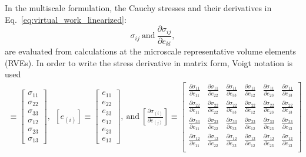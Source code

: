 In the multiscale formulation, the Cauchy stresses and their derivatives in Eq.\ \eqref{eq:virtual_work_linearized}:
%
\begin{equation}
\sigma_{ij} \ \text{and} \ \frac{\partial \sigma_{ij}}{\partial e_{kl}},
\label{eq:sigma_terms}
\end{equation}
%
are evaluated from calculations at the microscale representative volume elements (RVEs). In order to write the stress derivative in matrix form, Voigt notation is used 
%
\begin{eqnarray}
[\sigma_{(i)}] \equiv 
\begin{bmatrix}
\sigma_{11} \\ \sigma_{22} \\ \sigma_{33} \\ \sigma_{12} \\ \sigma_{23} \\ \sigma_{13}
\end{bmatrix} , \ \
%
[e_{(i)}] \equiv
\begin{bmatrix}
e_{11} \\ e_{22} \\ e_{33} \\ e_{12} \\ e_{23} \\ e_{13} 
\end{bmatrix}, \ \text{and} \
%
\left[ \frac{\partial \sigma_{(i)}}{\partial e_{(j)}} \right] \equiv 
\begin{bmatrix}
\frac{\partial \sigma_{11}}{\partial e_{11}} & \frac{\partial \sigma_{11}}{\partial e_{22}} & \frac{\partial \sigma_{11}}{\partial e_{33}} & \frac{\partial \sigma_{11}}{\partial e_{12}} & \frac{\partial \sigma_{11}}{\partial e_{23}} & \frac{\partial \sigma_{11}}{\partial e_{13}} \\
%
\frac{\partial \sigma_{22}}{\partial e_{11}} & \frac{\partial \sigma_{22}}{\partial e_{22}} & \frac{\partial \sigma_{22}}{\partial e_{33}} & \frac{\partial \sigma_{22}}{\partial e_{12}} & \frac{\partial \sigma_{22}}{\partial e_{23}} & \frac{\partial \sigma_{22}}{\partial e_{13}} \\
%
\frac{\partial \sigma_{33}}{\partial e_{11}} & \frac{\partial \sigma_{33}}{\partial e_{22}} & \frac{\partial \sigma_{33}}{\partial e_{33}} & \frac{\partial \sigma_{33}}{\partial e_{12}} & \frac{\partial \sigma_{33}}{\partial e_{23}} & \frac{\partial \sigma_{33}}{\partial e_{13}} \\
%
\frac{\partial \sigma_{12}}{\partial e_{11}} & \frac{\partial \sigma_{12}}{\partial e_{22}} & \frac{\partial \sigma_{12}}{\partial e_{33}} & \frac{\partial \sigma_{12}}{\partial e_{12}} & \frac{\partial \sigma_{12}}{\partial e_{23}} & \frac{\partial \sigma_{12}}{\partial e_{13}} \\

\end{bmatrix}
\end{eqnarray}
